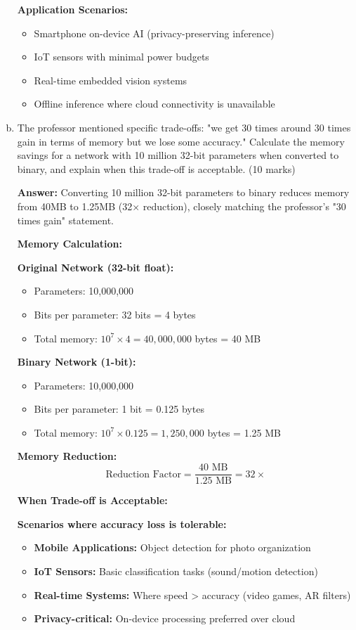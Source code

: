 \documentclass[12pt]{article}
\newcommand{\answer}[1]{{\color{answercolor}\textbf{Answer:} #1}}
\newcommand{\explanation}[1]{{\color{explanationcolor}#1}}
\begin{document}
\begin{enumerate}[(a)]
{    \textbf{Application Scenarios:}
    \begin{itemize}
        \item Smartphone on-device AI (privacy-preserving inference)
        \item IoT sensors with minimal power budgets
        \item Real-time embedded vision systems
        \item Offline inference where cloud connectivity is unavailable
    \end{itemize}
    }
    
    \item The professor mentioned specific trade-offs: "we get 30 times around 30 times gain in terms of memory but we lose some accuracy." Calculate the memory savings for a network with 10 million 32-bit parameters when converted to binary, and explain when this trade-off is acceptable. \hfill (10 marks)
    
    \answer{Converting 10 million 32-bit parameters to binary reduces memory from 40MB to 1.25MB (32× reduction), closely matching the professor's "30 times gain" statement.}
    
    \explanation{
    \textbf{Memory Calculation:}
    
    \textbf{Original Network (32-bit float):}
    \begin{itemize}
        \item Parameters: 10,000,000
        \item Bits per parameter: 32 bits = 4 bytes
        \item Total memory: $10^7 \times 4 = 40,000,000$ bytes = 40 MB
    \end{itemize}
    
    \textbf{Binary Network (1-bit):}
    \begin{itemize}
        \item Parameters: 10,000,000
        \item Bits per parameter: 1 bit = 0.125 bytes
        \item Total memory: $10^7 \times 0.125 = 1,250,000$ bytes = 1.25 MB
    \end{itemize}
    
    \textbf{Memory Reduction:}
    $$\text{Reduction Factor} = \frac{40 \text{ MB}}{1.25 \text{ MB}} = 32×$$
    
    \textbf{When Trade-off is Acceptable:}
    
    \textbf{Scenarios where accuracy loss is tolerable:}
    \begin{itemize}
        \item \textbf{Mobile Applications:} Object detection for photo organization
        \item \textbf{IoT Sensors:} Basic classification tasks (sound/motion detection)
        \item \textbf{Real-time Systems:} Where speed > accuracy (video games, AR filters)
        \item \textbf{Privacy-critical:} On-device processing preferred over cloud
    \end{itemize}
    
}
\end{enumerate}
\end{document}
